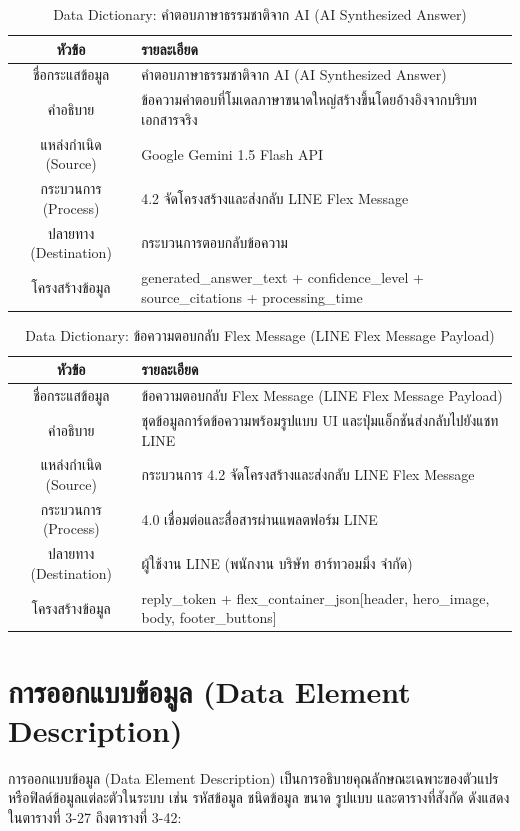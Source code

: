 \begin{table}[htbp]
\centering
\caption{Data Dictionary: คำตอบภาษาธรรมชาติจาก AI (AI Synthesized Answer)}
\label{tab3:df_ai_answer}
\begin{tabularx}{\textwidth}{| c | L |}
\hline
\textbf{หัวข้อ} & \textbf{รายละเอียด} \\ \hline
ชื่อกระแสข้อมูล & คำตอบภาษาธรรมชาติจาก AI (AI Synthesized Answer) \\ \hline
คำอธิบาย & ข้อความคำตอบที่โมเดลภาษาขนาดใหญ่สร้างขึ้นโดยอ้างอิงจากบริบทเอกสารจริง \\ \hline
แหล่งกำเนิด (Source) & Google Gemini 1.5 Flash API \\ \hline
กระบวนการ (Process) & 4.2 จัดโครงสร้างและส่งกลับ LINE Flex Message \\ \hline
ปลายทาง (Destination) & กระบวนการตอบกลับข้อความ \\ \hline
โครงสร้างข้อมูล & generated\_answer\_text + confidence\_level + source\_citations + processing\_time \\ \hline
\end{tabularx}
\end{table}

\begin{table}[htbp]
\centering
\caption{Data Dictionary: ข้อความตอบกลับ Flex Message (LINE Flex Message Payload)}
\label{tab3:df_flex_reply}
\begin{tabularx}{\textwidth}{| c | L |}
\hline
\textbf{หัวข้อ} & \textbf{รายละเอียด} \\ \hline
ชื่อกระแสข้อมูล & ข้อความตอบกลับ Flex Message (LINE Flex Message Payload) \\ \hline
คำอธิบาย & ชุดข้อมูลการ์ดข้อความพร้อมรูปแบบ UI และปุ่มแอ็กชันส่งกลับไปยังแชท LINE \\ \hline
แหล่งกำเนิด (Source) & กระบวนการ 4.2 จัดโครงสร้างและส่งกลับ LINE Flex Message \\ \hline
กระบวนการ (Process) & 4.0 เชื่อมต่อและสื่อสารผ่านแพลตฟอร์ม LINE \\ \hline
ปลายทาง (Destination) & ผู้ใช้งาน LINE (พนักงาน บริษัท ฮาร์ทวอมมิ่ง จำกัด) \\ \hline
โครงสร้างข้อมูล & reply\_token + flex\_container\_json[header, hero\_image, body, footer\_buttons] \\ \hline
\end{tabularx}
\end{table}

\section{การออกแบบข้อมูล (Data Element Description)}
\hspace*{1.3em}
การออกแบบข้อมูล (Data Element Description) เป็นการอธิบายคุณลักษณะเฉพาะของตัวแปรหรือฟิลด์ข้อมูลแต่ละตัวในระบบ เช่น รหัสข้อมูล ชนิดข้อมูล ขนาด รูปแบบ และตารางที่สังกัด ดังแสดงในตารางที่ 3-27 ถึงตารางที่ 3-42:

